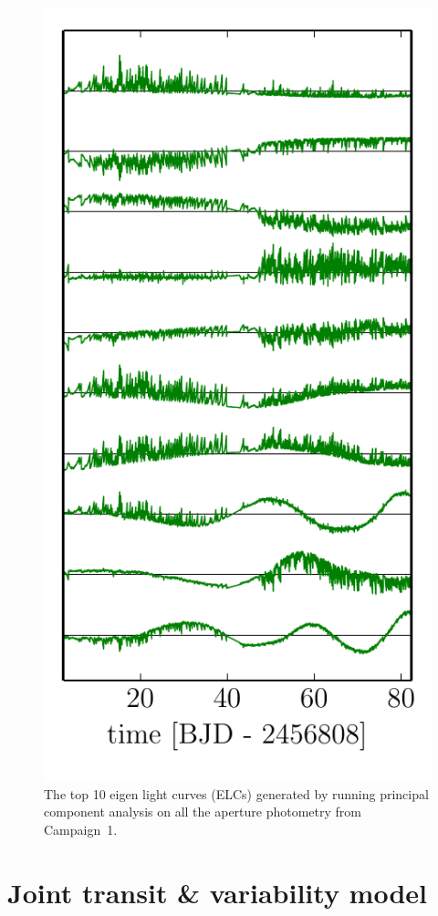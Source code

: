 \documentclass[12pt,preprint]{aastex}
\newcommand{\figlabel}[1]{\label{fig:#1}}
\newcommand{\sectlabel}[1]{\label{sect:#1}}
\begin{document}
\begin{figure}[p]
\begin{center}
\includegraphics{figures/pca.pdf}
\end{center}
\caption{%
The top 10 eigen light curves (ELCs) generated by running principal component
analysis on all the aperture photometry from Campaign~1.
\figlabel{pca}}
\end{figure}


\section{Joint transit \& variability model}
\sectlabel{model}
\end{document}
